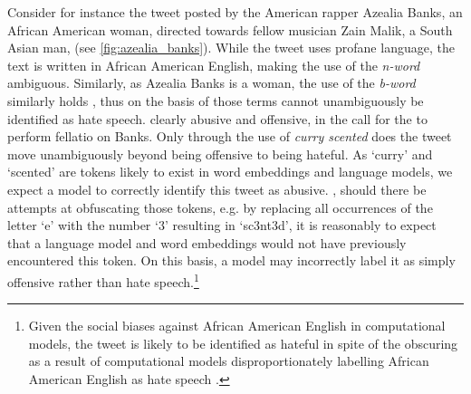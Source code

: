 Consider for instance the tweet posted by the American rapper Azealia Banks, an African American woman, directed towards fellow musician Zain Malik, a South Asian man, (see \autoref{fig:azealia_banks}).
While the tweet uses profane language, the text is written in African American English, making the use of the \textit{n-word} ambiguous.
Similarly, as Azealia Banks is a woman, the use of the \textit{b-word} similarly holds , thus on the basis of those terms  cannot unambiguously be identified as hate speech.
 clearly  abusive and offensive, in the call for the  to perform fellatio on Banks.
Only through the use of \textit{curry scented} does the tweet move unambiguously beyond  being offensive to being hateful.
As `curry' and `scented' are tokens likely to exist in  word embeddings and language models, we  expect a model to correctly identify this tweet as abusive.
, should there be attempts at obfuscating those tokens, e.g. by replacing all occurrences of the letter `e' with the number `$3$' resulting in `sc3nt3d', it is reasonably to expect that a language model and word embeddings would not have previously encountered this token. 
On this basis, a model may incorrectly label it as simply offensive rather than hate speech.\footnote{Given the social biases against African American English in computational models, the tweet is likely to be identified as hateful in spite of the obscuring as a result of computational models disproportionately labelling African American English as hate speech \citep{Davidson:2019}.}

